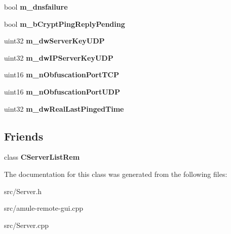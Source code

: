 \begin{DoxyCompactItemize}
\item 
bool {\bfseries m\_\-dnsfailure}\label{classCServer_ae7c5dae288ad105532f7b4e0e1150f25}

\item 
bool {\bfseries m\_\-bCryptPingReplyPending}\label{classCServer_a90595c40843312690368af31374272c9}

\item 
uint32 {\bfseries m\_\-dwServerKeyUDP}\label{classCServer_a194ee60230ae8a661d2da55ddb886686}

\item 
uint32 {\bfseries m\_\-dwIPServerKeyUDP}\label{classCServer_a6dcc9ae6e28b460620554f9258d1bd02}

\item 
uint16 {\bfseries m\_\-nObfuscationPortTCP}\label{classCServer_a385f4cc61dc0074fdb44b90633f1573a}

\item 
uint16 {\bfseries m\_\-nObfuscationPortUDP}\label{classCServer_a4d474cba796831ed0dd16fdbc4184d9e}

\item 
uint32 {\bfseries m\_\-dwRealLastPingedTime}\label{classCServer_a800f2286c4c93fd4ef94dbc92776bb8f}

\end{DoxyCompactItemize}
\subsection*{Friends}
\begin{DoxyCompactItemize}
\item 
class {\bf CServerListRem}\label{classCServer_a8dc97d3ed6ba99062fcf48ce8f5150ca}

\end{DoxyCompactItemize}


The documentation for this class was generated from the following files:\begin{DoxyCompactItemize}
\item 
src/Server.h\item 
src/amule-\/remote-\/gui.cpp\item 
src/Server.cpp\end{DoxyCompactItemize}

